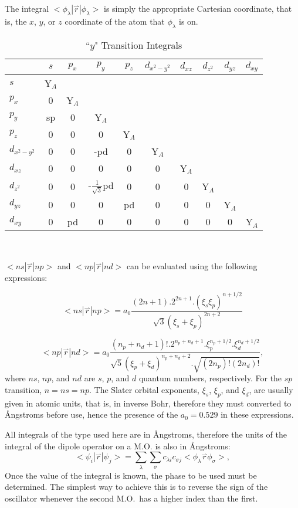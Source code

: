 The integral
 $<\! \phi_{\lambda}|\stackrel{\rightharpoonup}{r}|\phi_{\lambda}\! >$ is simply the appropriate Cartesian coordinate,
that is, the $x$, $y$, or $z$ coordinate of the atom that $\phi_{\lambda}$ is on.

\begin{table}
\caption{\label{transy} ``$y$" Transition Integrals}
\begin{center}
\begin{tabular}{l|ccccccccc} \hline
& $s$  &  $p_x$  &  $p_y$  &  $p_z$  &  $d_{x^2-y^2}$  & $d_{xz}$  &
$d_{z^2}$  &  $d_{yz}$  &  $d_{xy}$ \\ \hline
$s$ & Y$_A$\\
$p_x$ & 0 & Y$_A$\\
$p_y$  & sp & 0 & Y$_A$ \\
$p_z$  & 0 & 0 & 0 & Y$_A$\\
$d_{x^2-y^2}$ & 0 & 0 & -pd & 0 & Y$_A$\\
$d_{xz}$      & 0 & 0 & 0 & 0 & 0 & Y$_A$\\
$d_{z^2}$     & 0 & 0 & -$\frac{1}{\sqrt{3}}$pd & 0 & 0 & 0 & Y$_A$\\
$d_{yz}$      & 0 & 0 & 0 & pd & 0 & 0 & 0 & Y$_A$\\
$d_{xy}$      & 0 & pd & 0 & 0 & 0 & 0 & 0 & 0 & Y$_A$\\  \hline


\end{tabular}\\
\end{center}
\end{table}


 $<\! ns|\stackrel{\rightharpoonup}{r}|np\! >$
 and  $<\! np|\stackrel{\rightharpoonup}{r}|nd\! >$
 can be evaluated using the following expressions:

$$
<\! ns|\stackrel{\rightharpoonup}{r}|np\! > = a_0\frac{(2n+1).2^{2n+1}.(\xi_s\xi_p)^{n+1/2}}{\sqrt{3}(\xi_s+\xi_p)^{2n+2}}
$$

$$
<np|\stackrel{\rightharpoonup}{r}|nd>=a_0\frac{(n_p+n_d+1)!.2^{n_p+n_d+1}.\xi_p^{n_p+1/2}.\xi_d^{n_d+1/2}}
{\sqrt{5}(\xi_p+\xi_d)^{n_p+n_d+2}.\sqrt{(2n_p)!(2n_d)!}},
$$
where $ns$, $np$, and $nd$ are $s$, $p$, and $d$ quantum numbers, respectively.
For the $sp$ transition, $n=ns=np$.
The Slater orbital exponents, $\xi_s$, $\xi_p$, and $\xi_d$, are usually
given in atomic units, that is, in
inverse Bohr, therefore they must converted to \AA ngstroms before use, hence the
presence of the $a_0=0.529$ in these expressions.

All integrals of the type used here are in \AA ngstroms, therefore the units of the integral
of the dipole operator on a M.O. is also in \AA ngstroms:
$$
<\! \psi_i|\stackrel{\rightharpoonup}{r}|\psi_j\! > =\sum_{\lambda}\sum_{\sigma}c_{\lambda i}c_{\sigma j}
<\! \phi_{\lambda}\stackrel{\rightharpoonup}{r}\phi_{\sigma} \!>,
$$
 Once the value of the integral is known,
the phase to be used must be determined. The simplest way to achieve this
is to reverse the sign of the oscillator whenever the second M.O.\ has a
higher index than the first.

